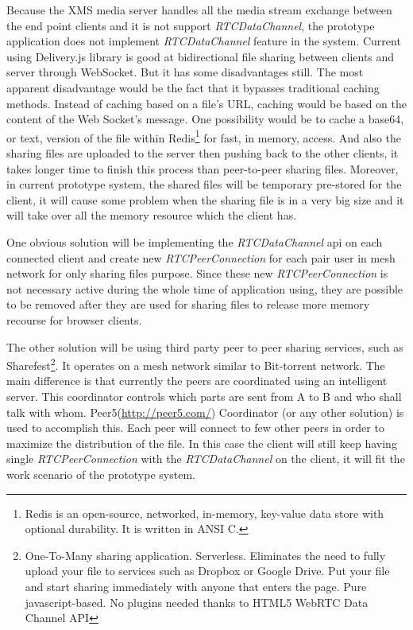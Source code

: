 \par Because the XMS media server handles all the media stream exchange between the end point clients and it is not support \textit{RTCDataChannel}, the prototype application does not implement \textit{RTCDataChannel} feature in the system. Current using Delivery.js library is good at bidirectional file sharing between clients and server through WebSocket. But it has some disadvantages still. The most apparent disadvantage would be the fact that it bypasses traditional caching methods. Instead of caching based on a file’s URL, caching would be based on the content of the Web Socket’s message. One possibility would be to cache a base64, or text, version of the file within Redis\footnote{Redis is an open-source, networked, in-memory, key-value data store with optional durability. It is written in ANSI C.\cite{wiki:redis}} for fast, in memory, access. And also the sharing files are uploaded to the server then pushing back to the other clients, it takes longer time to finish this process than peer-to-peer sharing files. Moreover, in current prototype system, the shared files will be temporary pre-stored for the client, it will cause some problem when the sharing file is in a very big size and it will take over all the memory resource which the client has.

\par One obvious solution will be implementing the \textit{RTCDataChannel} \gls{api} on each connected client and create new \textit{RTCPeerConnection} for each pair user in mesh network for only sharing files purpose. Since these new \textit{RTCPeerConnection}
is not necessary active during the whole time of application using, they are possible to be removed after they are used for sharing files to release more memory recourse for browser clients.

\par The other solution will be using third party peer to peer sharing services, such as Sharefest\footnote{One-To-Many sharing application. Serverless. Eliminates the need to fully upload your file to services such as Dropbox or Google Drive. Put your file and start sharing immediately with anyone that enters the page. Pure javascript-based. No plugins needed thanks to HTML5 WebRTC Data Channel API}. It operates on a mesh network similar to Bit-torrent network. The main difference is that currently the peers are coordinated using an intelligent server. This coordinator controls which parts are sent from A to B and who shall talk with whom. Peer5(\url{http://peer5.com/}) Coordinator (or any other solution) is used to accomplish this. Each peer will connect to few other peers in order to maximize the distribution of the file.\cite{github:sharefest} In this case the client will still keep having single \textit{RTCPeerConnection} with the \textit{RTCDataChannel} on the client, it will fit the work scenario of the prototype system.

